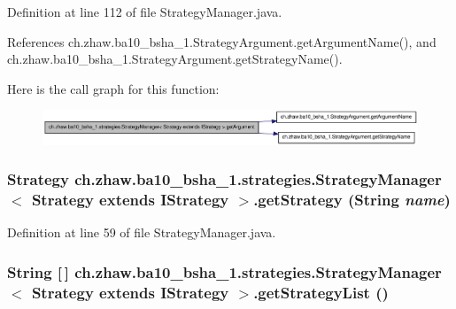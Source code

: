 Definition at line 112 of file StrategyManager.java.

References ch.zhaw.ba10\_\-bsha\_\-1.StrategyArgument.getArgumentName(), and ch.zhaw.ba10\_\-bsha\_\-1.StrategyArgument.getStrategyName().

Here is the call graph for this function:\nopagebreak
\begin{figure}[H]
\begin{center}
\leavevmode
\includegraphics[width=395pt]{classch_1_1zhaw_1_1ba10__bsha__1_1_1strategies_1_1StrategyManager_3_01Strategy_01extends_01IStrategy_01_4_adc2e565e79c96210a98da9a84f9d8fbe_cgraph}
\end{center}
\end{figure}
\hypertarget{classch_1_1zhaw_1_1ba10__bsha__1_1_1strategies_1_1StrategyManager_3_01Strategy_01extends_01IStrategy_01_4_a23f8ab3d6390dec06740ce73a3aab495}{
\subsubsection[{getStrategy}]{\setlength{\rightskip}{0pt plus 5cm}Strategy ch.zhaw.ba10\_\-bsha\_\-1.strategies.StrategyManager$<$ Strategy extends {\bf IStrategy} $>$.getStrategy (String {\em name})}}
\label{classch_1_1zhaw_1_1ba10__bsha__1_1_1strategies_1_1StrategyManager_3_01Strategy_01extends_01IStrategy_01_4_a23f8ab3d6390dec06740ce73a3aab495}


Definition at line 59 of file StrategyManager.java.\hypertarget{classch_1_1zhaw_1_1ba10__bsha__1_1_1strategies_1_1StrategyManager_3_01Strategy_01extends_01IStrategy_01_4_a8f7debe1707ac6bef066c4aa902f7428}{
\subsubsection[{getStrategyList}]{\setlength{\rightskip}{0pt plus 5cm}String \mbox{[}$\,$\mbox{]} ch.zhaw.ba10\_\-bsha\_\-1.strategies.StrategyManager$<$ Strategy extends {\bf IStrategy} $>$.getStrategyList ()}}
\label{classch_1_1zhaw_1_1ba10__bsha__1_1_1strategies_1_1StrategyManager_3_01Strategy_01extends_01IStrategy_01_4_a8f7debe1707ac6bef066c4aa902f7428}


